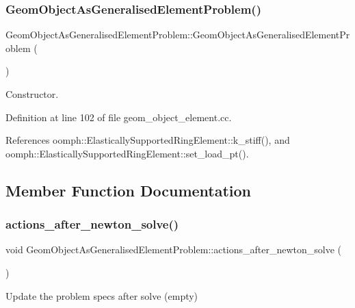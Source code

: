 \subsubsection{\texorpdfstring{Geom\+Object\+As\+Generalised\+Element\+Problem()}{GeomObjectAsGeneralisedElementProblem()}}
{\footnotesize\ttfamily Geom\+Object\+As\+Generalised\+Element\+Problem\+::\+Geom\+Object\+As\+Generalised\+Element\+Problem (\begin{DoxyParamCaption}{ }\end{DoxyParamCaption})}



Constructor. 



Definition at line 102 of file geom\+\_\+object\+\_\+element.\+cc.



References oomph\+::\+Elastically\+Supported\+Ring\+Element\+::k\+\_\+stiff(), and oomph\+::\+Elastically\+Supported\+Ring\+Element\+::set\+\_\+load\+\_\+pt().



\subsection{Member Function Documentation}
\mbox{\label{classGeomObjectAsGeneralisedElementProblem_af396d1789e2552c43e0c68561d88d473}} 
\subsubsection{\texorpdfstring{actions\+\_\+after\+\_\+newton\+\_\+solve()}{actions\_after\_newton\_solve()}}
{\footnotesize\ttfamily void Geom\+Object\+As\+Generalised\+Element\+Problem\+::actions\+\_\+after\+\_\+newton\+\_\+solve (\begin{DoxyParamCaption}{ }\end{DoxyParamCaption})\hspace{0.3cm}{\ttfamily [inline]}}



Update the problem specs after solve (empty) 



